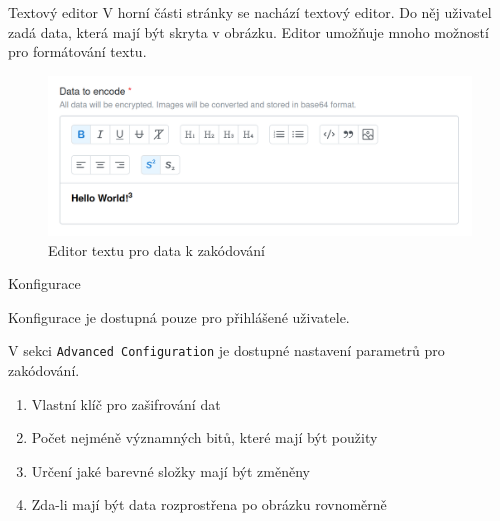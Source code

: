 \begin{subsubsection}{Textový editor}\label{subsubsec:textovy-editor}
V horní části stránky se nachází textový editor.
Do něj uživatel zadá data, která mají být skryta v obrázku.
Editor umožňuje mnoho možností pro formátování textu.

\begin{figure}
    \centering
    \includegraphics[scale=0.5]{assets/images/encode-editor}
    \caption{Editor textu pro data k zakódování}\label{fig:editor-textu}
\end{figure}

\end{subsubsection}

\begin{subsubsection}{Konfigurace}\label{subsubsec:enc-konfigurace}

Konfigurace je dostupná pouze pro přihlášené uživatele.

V sekci \texttt{Advanced Configuration} je dostupné nastavení parametrů
pro zakódování.

\begin{enumerate}
    \item Vlastní klíč pro zašifrování dat
    \item Počet nejméně významných bitů, které mají být použity
    \item Určení jaké barevné složky mají být změněny
    \item Zda-li mají být data rozprostřena po obrázku rovnoměrně
\end{enumerate}

\end{subsubsection}

